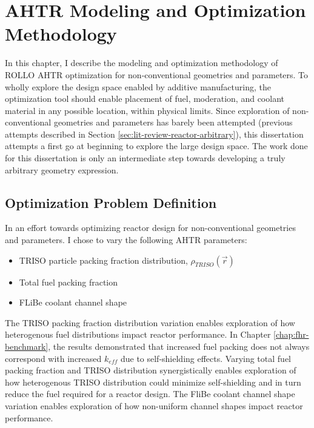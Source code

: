 \chapter{AHTR Modeling and Optimization Methodology}
In this chapter, I describe the modeling and optimization methodology of
\gls{ROLLO} \gls{AHTR} optimization for non-conventional geometries and parameters.
To wholly explore the design space enabled by additive manufacturing, the 
optimization tool should enable placement of fuel, moderation, and coolant material 
in any possible location, within physical limits. 
Since exploration of non-conventional geometries and parameters has barely been
attempted (previous attempts described in Section \ref{sec:lit-review-reactor-arbitrary}), 
this dissertation attempts a first go at beginning to explore the large design space.  
The work done for this dissertation is only an intermediate step towards developing 
a truly arbitrary geometry expression. 


\section{Optimization Problem Definition}
\label{sec:opt-problem}
In an effort towards optimizing reactor design for non-conventional geometries 
and parameters.
I chose to vary the following \gls{AHTR} parameters: 
\begin{itemize}
    \item \gls{TRISO} particle packing fraction distribution, 
    $\rho_{TRISO}(\vec{r})$
    \item Total fuel packing fraction
    \item \gls{FLiBe} coolant channel shape 
\end{itemize} 
The TRISO packing fraction distribution variation enables exploration of how 
heterogenous fuel distributions impact reactor performance.
In Chapter \ref{chap:fhr-benchmark}, the results demonstrated that increased fuel 
packing does not always correspond with increased $k_{eff}$ due to self-shielding
effects. 
Varying total fuel packing fraction and TRISO distribution synergistically enables exploration of
how heterogenous TRISO distribution could minimize self-shielding and in turn reduce the fuel 
required for a reactor design. 
The FliBe coolant channel shape variation enables exploration of how non-uniform 
channel shapes impact reactor performance. 

